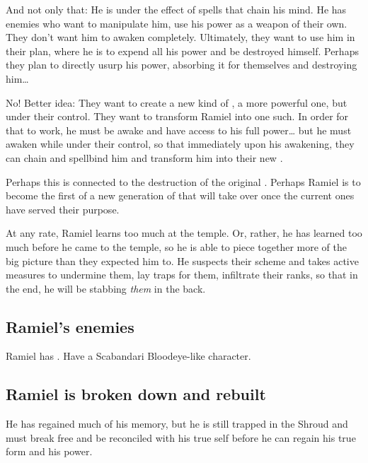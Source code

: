 And not only that: He is under the effect of spells that chain his mind. He has enemies who want to manipulate him, use his power as a weapon of their own. They don't want him to awaken completely. Ultimately, they want to use him in their plan, where he is to expend all his power and be destroyed himself. Perhaps they plan to directly usurp his power, absorbing it for themselves and destroying him\ldots{}

No! Better idea: They want to create a new kind of \Sephirah, a more powerful one, but under their control. They want to transform Ramiel into one such. In order for that to work, he must be awake and have access to his full \sathariah{} power\ldots{} but he must awaken while under their control, so that immediately upon his awakening, they can chain and spellbind him and transform him into their new \Sephirah. 

Perhaps this is connected to the destruction of the original \Sephiroth. Perhaps Ramiel is to become the first of a new generation of \Sephiroth{} that will take over once the current ones have served their purpose. 

At any rate, Ramiel learns too much at the temple. Or, rather, he has learned too much before he came to the temple, so he is able to piece together more of the big picture than they expected him to. He suspects their scheme and takes active measures to undermine them, lay traps for them, infiltrate their ranks, so that in the end, he will be stabbing \emph{them} in the back. 







\subsection{Ramiel's enemies}
Ramiel has . 
Have a Scabandari Bloodeye-like character. 







\subsection{Ramiel is broken down and rebuilt}
He has regained much of his memory, but he is still trapped in the Shroud and must break free and be reconciled with his true self before he can regain his true \resphan{} form and his \sathariah{} power. 

